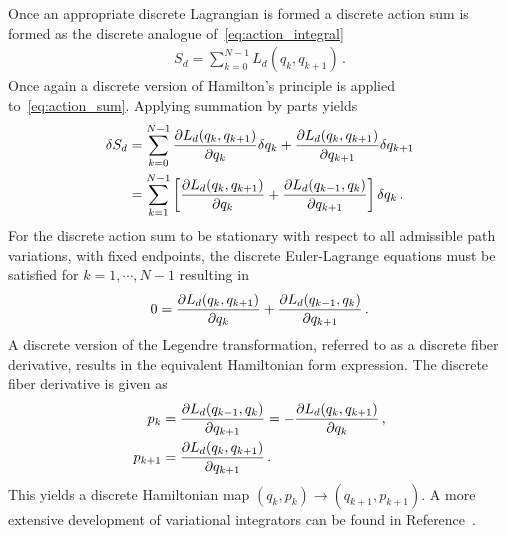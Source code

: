 \documentclass[letterpaper, paper,11pt]{AAS}		%
\begin{document}
Once an appropriate discrete Lagrangian is formed a discrete action sum is formed as the discrete analogue of~\cref{eq:action_integral}
\begin{align}\label{eq:action_sum}
	S_d = \sum_{k=0}^{N-1} L_d(q_k, q_{k+1}) \, .
\end{align}
Once again a discrete version of Hamilton's principle is applied to~\cref{eq:action_sum}.
Applying summation by parts yields
\begin{subequations}
\begin{align}\label{eq:dis_var_principle}
	\delta S_d &= \sum_{k=0}^{N-1} \deriv{L_d(q_k, q_{k+1})}{q_k} \delta q_k + \deriv{L_d(q_k, q_{k+1})}{q_{k+1}} \delta q_{k+1} \\
	&= \sum_{k=1}^{N-1} \bracket{ \deriv{L_d(q_k, q_{k+1})}{q_k} + \deriv{L_d(q_{k-1}, q_k)}{q_{k+1}}} \delta q_k \, .
\end{align}
\end{subequations}
For the discrete action sum to be stationary with respect to all admissible path variations, with fixed endpoints, the discrete Euler-Lagrange equations must be satisfied for \( k = 1, \cdots, N-1 \) resulting in
\begin{align}\label{eq:discrete_euler-lagrange}
	0 = \deriv{L_d(q_k, q_{k+1})}{q_k} + \deriv{L_d(q_{k-1}, q_k)}{q_{k+1}} \, .
\end{align}
A discrete version of the Legendre transformation, referred to as a discrete fiber derivative, results in the equivalent Hamiltonian form expression.
The discrete fiber derivative is given as 
\begin{subequations}\label{eq:discrete_legendre}
\begin{align}
	p_k &= \frac{\partial L_d(q_{k-1},q_k)}{\partial q_{k+1}} = - \frac{\partial L_d(q_k, q_{k+1})}{\partial q_k} \, ,\\
	p_{k+1} &= \frac{\partial L_d(q_k, q_{k+1})}{\partial q_{k+1}} \, .
\end{align}
\end{subequations}
This yields a discrete Hamiltonian map \( (q_k, p_k) \to (q_{k+1}, p_{k+1}) \).
A more extensive development of variational integrators can be found in Reference~.
\end{document}
